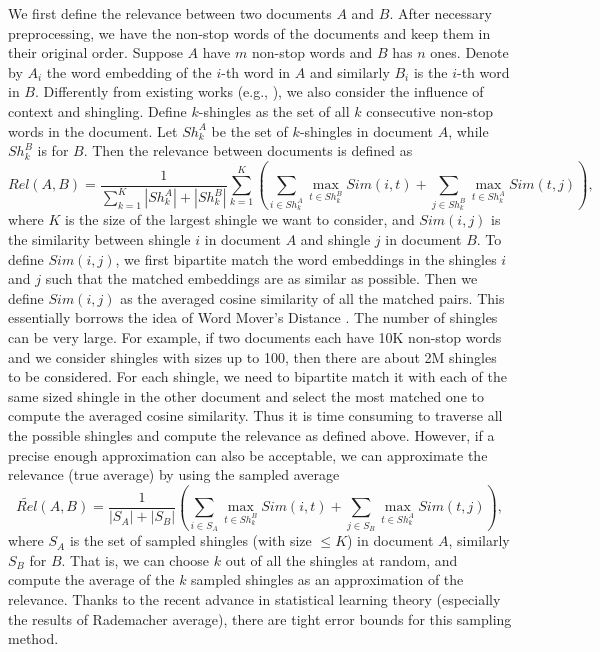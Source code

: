 \documentclass{article}
\begin{document}
We first define the relevance between two documents $A$ and $B$. After necessary preprocessing, we have the non-stop words of the documents and keep them in their original order. Suppose $A$ have $m$ non-stop words and $B$ has $n$ ones. Denote by $A_i$ the word embedding of the $i$-th word in $A$ and similarly $B_i$ is the $i$-th word in $B$. Differently from existing works (e.g., \cite{KSK15}), we also consider the influence of context and shingling. Define $k$-shingles as the set of all $k$ consecutive non-stop words in the document. Let $Sh_k^A$ be the set of $k$-shingles in document $A$, while $Sh_k^B$ is for $B$. Then the relevance between documents is defined as
$$Rel(A,B) = \frac{1}{\sum_{k=1}^K|Sh_k^A|+|Sh_k^B|} \sum_{k=1}^K \left(\sum_{i\in Sh_k^A} \max_{t\in Sh_k^B} Sim(i, t) + \sum_{j\in Sh_k^B} \max_{t\in Sh_k^A} Sim(t, j)\right),$$
where $K$ is the size of the largest shingle we want to consider, and $Sim(i, j)$ is the similarity between shingle $i$ in document $A$ and shingle $j$ in document $B$. To define $Sim(i, j)$, we first bipartite match the word embeddings in the shingles $i$ and $j$ such that the matched embeddings are as similar as possible. Then we define $Sim(i, j)$ as the averaged cosine similarity of all the matched pairs. This essentially borrows the idea of Word Mover's Distance \cite{KSK15}.
The number of shingles can be very large. For example, if two documents each have 10K non-stop words and we consider shingles with sizes up to 100, then there are about 2M shingles to be considered. For each shingle, we need to bipartite match it with each of the same sized shingle in the other document and select the most matched one to compute the averaged cosine similarity. Thus it is time consuming to traverse all the possible shingles and compute the relevance as defined above. However, if a precise enough approximation can also be acceptable, we can approximate the relevance (true average) by using the sampled average
$$\widetilde{Rel}(A,B) = \frac{1}{|S_A|+|S_B|} \left(\sum_{i\in S_A} \max_{t\in Sh_k^B} Sim(i, t) + \sum_{j\in S_B} \max_{t\in Sh_k^A} Sim(t, j)\right),$$
where $S_A$ is the set of sampled shingles (with size $\leq K$) in document $A$, similarly $S_B$ for $B$. 
That is, we can choose $k$ out of all the shingles at random, and compute the average of the $k$ sampled shingles as an approximation of the relevance.
Thanks to the recent advance in statistical learning theory (especially the results of Rademacher average), there are tight error bounds for this sampling method.
\end{document}
